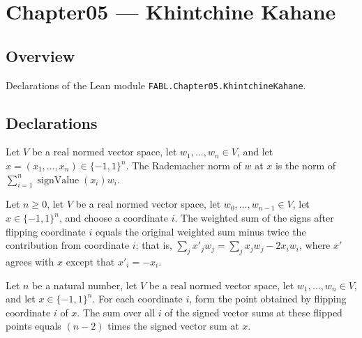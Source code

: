 \chapter{Chapter05 — Khintchine Kahane}
\section{Overview}

Declarations of the Lean module \texttt{FABL.Chapter05.KhintchineKahane}.

\section{Declarations}

\begin{definition}
\label{FABL.rademacherNorm}
\leanok
{}
Let $V$ be a real normed vector space, let $w_1,\ldots,w_n\in V$, and let
$x=(x_1,\ldots,x_n)\in\{-1,1\}^n$. The Rademacher norm of $w$ at $x$ is the norm of
$\sum_{i=1}^n \operatorname{signValue}(x_i)w_i$.
\end{definition}

\begin{theorem}
\label{FABL.signedSum_flipCoordinate}
\leanok
{}
Let $n\ge 0$, let $V$ be a real normed vector space, let $w_0,\ldots,w_{n-1}\in V$, let
$x\in\{-1,1\}^n$, and choose a coordinate $i$. The weighted sum of the signs after
flipping coordinate $i$ equals the original weighted sum minus twice the contribution
from coordinate $i$; that is, $\sum_j x'_j w_j=\sum_j x_jw_j-2x_iw_i$, where $x'$ agrees
with $x$ except that $x'_i=-x_i$.
\end{theorem}

\begin{theorem}
\label{FABL.sum_signedSum_flipCoordinate}
\leanok
{}
Let $n$ be a natural number, let $V$ be a real normed vector space, let
$w_1,\ldots,w_n\in V$, and let $x\in\{-1,1\}^n$. For each coordinate $i$, form the point
obtained by flipping coordinate $i$ of $x$. The sum over all $i$ of the signed vector
sums at these flipped points equals $(n-2)$ times the signed vector sum at $x$.
\end{theorem}

